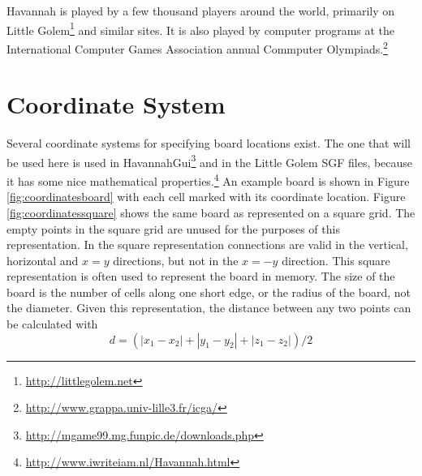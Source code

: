 Havannah is played by a few thousand players around the world, primarily on Little Golem\footnote{\url{http://littlegolem.net}} and similar sites. It is also played by computer programs at the International Computer Games Association annual Commputer Olympiads.\footnote{\url{http://www.grappa.univ-lille3.fr/icga/}}



\section{Coordinate System}

Several coordinate systems for specifying board locations exist. The one that will be used here is used in HavannahGui\footnote{\url{http://mgame99.mg.funpic.de/downloads.php}} and in the Little Golem SGF files, because it has some nice mathematical properties.\footnote{\url{http://www.iwriteiam.nl/Havannah.html}} An example board is shown in Figure \ref{fig:coordinatesboard} with each cell marked with its coordinate location. Figure \ref{fig:coordinatessquare} shows the same board as represented on a square grid. The empty points in the square grid are unused for the purposes of this representation. In the square representation connections are valid in the vertical, horizontal and $x=y$ directions, but not in the $x=-y$ direction. This square representation is often used to represent the board in memory. The size of the board is the number of cells along one short edge, or the radius of the board, not the diameter. Given this representation, the distance between any two points can be calculated with $$d = (|x_1-x_2| + |y_1-y_2| + |z_1-z_2|)/2$$


